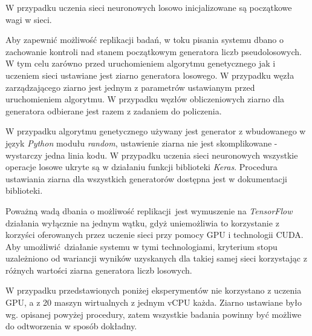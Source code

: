W przypadku uczenia sieci neuronowych losowo inicjalizowane są początkowe wagi w sieci.

Aby zapewnić możliwość replikacji badań, w toku pisania systemu dbano o zachowanie kontroli nad stanem początkowym generatora liczb pseudolosowych.
W tym celu zarówno przed uruchomieniem algorytmu genetycznego jak i uczeniem sieci ustawiane jest ziarno generatora losowego.
W przypadku węzła zarządzającego ziarno jest jednym z parametrów ustawianym przed uruchomieniem algorytmu.
W przypadku węzłów obliczeniowych ziarno dla generatora odbierane jest razem z zadaniem do policzenia.

W przypadku algorytmu genetycznego używany jest generator z wbudowanego w język \textit{Python} modułu \textit{random}, ustawienie ziarna nie jest skomplikowane - wystarczy jedna linia kodu.
W przypadku uczenia sieci neuronowych wszystkie operacje losowe ukryte są w działaniu funkcji biblioteki \textit{Keras}.
Procedura ustawiania ziarna dla wszystkich generatorów dostępna jest w dokumentacji biblioteki. \cite{chollet2015keras}

Poważną wadą dbania o możliwość replikacji jest wymuszenie na \textit{TensorFlow} działania wyłącznie na jednym wątku, gdyż uniemożliwia to korzystanie z korzyści oferowanych przez uczenie sieci przy pomocy GPU i technologii CUDA.
Aby umożliwić działanie systemu w tymi technologiami, kryterium stopu uzależniono od wariancji wyników uzyskanych dla takiej samej sieci korzystając z różnych wartości ziarna generatora liczb losowych.

W przypadku przedstawionych poniżej eksperymentów nie korzystano z uczenia GPU, a z 20 maszyn wirtualnych z jednym vCPU każda.
Ziarno ustawiane było wg. opisanej powyżej procedury, zatem wszystkie badania powinny być możliwe do odtworzenia w sposób dokładny.

